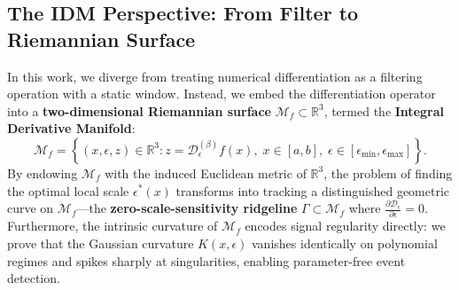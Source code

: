 \documentclass[11pt,a4paper]{article}
\theoremstyle{definition}
\begin{document}
\subsection{The IDM Perspective: From Filter to Riemannian Surface}
In this work, we diverge from treating numerical differentiation as a filtering operation with a static window. Instead, we embed the differentiation operator into a \textbf{two-dimensional Riemannian surface} $\mathcal{M}_f \subset \mathbb{R}^3$, termed the \textbf{Integral Derivative Manifold}:
\begin{equation}
\mathcal{M}_f = \left\{ (x, \epsilon, z) \in \mathbb{R}^3 : z = \mathcal{D}_\epsilon^{(\beta)} f(x), \; x \in [a, b], \; \epsilon \in [\epsilon_{\min}, \epsilon_{\max}] \right\}.
\end{equation}
By endowing $\mathcal{M}_f$ with the induced Euclidean metric of $\mathbb{R}^3$, the problem of finding the optimal local scale $\epsilon^*(x)$ transforms into tracking a distinguished geometric curve on $\mathcal{M}_f$---the \textbf{zero-scale-sensitivity ridgeline} $\Gamma \subset \mathcal{M}_f$ where $\frac{\partial \mathcal{D}_\epsilon}{\partial \epsilon} = 0$. Furthermore, the intrinsic curvature of $\mathcal{M}_f$ encodes signal regularity directly: we prove that the Gaussian curvature $K(x, \epsilon)$ vanishes identically on polynomial regimes and spikes sharply at singularities, enabling parameter-free event detection.
\end{document}
